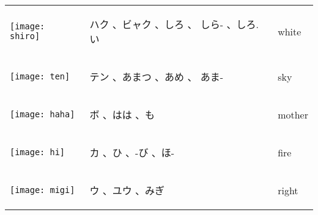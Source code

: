 \documentclass[a4paper,12pt]{extarticle}
\begin{document}
\begin{longtable}{|lp{6cm}p{4cm}|}
\begin{minipage}{0.3\textwidth}
\centerline{
	\texttt{[image: shiro]}
}
\end{minipage}
&
\begin{CJK}{UTF8}{min} ハク 、ビャク 、しろ 、 しら- 、しろ.い\end{CJK}
&
 white
\\ 
\begin{minipage}{0.3\textwidth}
\centerline{
	\texttt{[image: ten]}
}
\end{minipage}
&
\begin{CJK}{UTF8}{min} テン 、あまつ 、あめ 、 あま-\end{CJK}
&
 sky
\\ 
\begin{minipage}{0.3\textwidth}
\centerline{
	\texttt{[image: haha]}
}
\end{minipage}
&
\begin{CJK}{UTF8}{min} ボ 、はは 、も\end{CJK}
&
 mother
\\ 
\begin{minipage}{0.3\textwidth}
\centerline{
	\texttt{[image: hi]}
}
\end{minipage}
&
\begin{CJK}{UTF8}{min} カ 、ひ 、-び 、ほ-\end{CJK}
&
 fire
\\ 
\begin{minipage}{0.3\textwidth}
\centerline{
	\texttt{[image: migi]}
}
\end{minipage}
&
\begin{CJK}{UTF8}{min} ウ 、ユウ 、みぎ\end{CJK}
&
 right
\\ 

\end{longtable}
\end{document}
